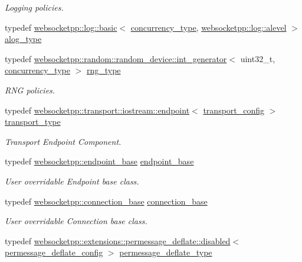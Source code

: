 \begin{DoxyCompactItemize}
\begin{DoxyCompactList}\small\item\em Logging policies. \end{DoxyCompactList}\item 
typedef \hyperlink{classwebsocketpp_1_1log_1_1basic}{websocketpp\+::log\+::basic}$<$ \hyperlink{structwebsocketpp_1_1config_1_1core__client_a4efeeb870e648c7405daab92d10fa5d6}{concurrency\+\_\+type}, \hyperlink{structwebsocketpp_1_1log_1_1alevel}{websocketpp\+::log\+::alevel} $>$ \hyperlink{structwebsocketpp_1_1config_1_1core__client_a98c19fba0898e3842c001248df82fb2a}{alog\+\_\+type}
\item 
typedef \hyperlink{classwebsocketpp_1_1random_1_1random__device_1_1int__generator}{websocketpp\+::random\+::random\+\_\+device\+::int\+\_\+generator}$<$ uint32\+\_\+t, \hyperlink{structwebsocketpp_1_1config_1_1core__client_a4efeeb870e648c7405daab92d10fa5d6}{concurrency\+\_\+type} $>$ \hyperlink{structwebsocketpp_1_1config_1_1core__client_adacb3a0ec249a2dea11871f299cf660f}{rng\+\_\+type}
\begin{DoxyCompactList}\small\item\em R\+N\+G policies. \end{DoxyCompactList}\item 
typedef \hyperlink{classwebsocketpp_1_1transport_1_1iostream_1_1endpoint}{websocketpp\+::transport\+::iostream\+::endpoint}$<$ \hyperlink{structwebsocketpp_1_1config_1_1core__client_1_1transport__config}{transport\+\_\+config} $>$ \hyperlink{structwebsocketpp_1_1config_1_1core__client_a8aafafefe476f36425d0fa2059a4db2a}{transport\+\_\+type}
\begin{DoxyCompactList}\small\item\em Transport Endpoint Component. \end{DoxyCompactList}\item 
typedef \hyperlink{classwebsocketpp_1_1endpoint__base}{websocketpp\+::endpoint\+\_\+base} \hyperlink{structwebsocketpp_1_1config_1_1core__client_a119692ecc6508696e567430caeb0e798}{endpoint\+\_\+base}
\begin{DoxyCompactList}\small\item\em User overridable Endpoint base class. \end{DoxyCompactList}\item 
typedef \hyperlink{classwebsocketpp_1_1connection__base}{websocketpp\+::connection\+\_\+base} \hyperlink{structwebsocketpp_1_1config_1_1core__client_a21e23793ee1a435b3a036166d0d70504}{connection\+\_\+base}
\begin{DoxyCompactList}\small\item\em User overridable Connection base class. \end{DoxyCompactList}\item 
typedef \hyperlink{classwebsocketpp_1_1extensions_1_1permessage__deflate_1_1disabled}{websocketpp\+::extensions\+::permessage\+\_\+deflate\+::disabled}$<$ \hyperlink{structwebsocketpp_1_1config_1_1core__client_1_1permessage__deflate__config}{permessage\+\_\+deflate\+\_\+config} $>$ \hyperlink{structwebsocketpp_1_1config_1_1core__client_a3887fabcaf40a720208c69a4604d37d2}{permessage\+\_\+deflate\+\_\+type}
\end{DoxyCompactItemize}
